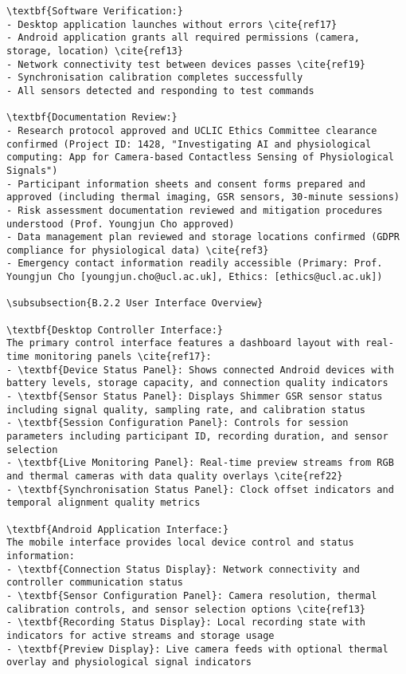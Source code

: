 \begin{verbatim}
\textbf{Software Verification:}
- Desktop application launches without errors \cite{ref17}
- Android application grants all required permissions (camera, storage, location) \cite{ref13}
- Network connectivity test between devices passes \cite{ref19}
- Synchronisation calibration completes successfully
- All sensors detected and responding to test commands

\textbf{Documentation Review:}
- Research protocol approved and UCLIC Ethics Committee clearance confirmed (Project ID: 1428, "Investigating AI and physiological computing: App for Camera-based Contactless Sensing of Physiological Signals")
- Participant information sheets and consent forms prepared and approved (including thermal imaging, GSR sensors, 30-minute sessions)
- Risk assessment documentation reviewed and mitigation procedures understood (Prof. Youngjun Cho approved)
- Data management plan reviewed and storage locations confirmed (GDPR compliance for physiological data) \cite{ref3}
- Emergency contact information readily accessible (Primary: Prof. Youngjun Cho [youngjun.cho@ucl.ac.uk], Ethics: [ethics@ucl.ac.uk])

\subsubsection{B.2.2 User Interface Overview}

\textbf{Desktop Controller Interface:}
The primary control interface features a dashboard layout with real-time monitoring panels \cite{ref17}:
- \textbf{Device Status Panel}: Shows connected Android devices with battery levels, storage capacity, and connection quality indicators
- \textbf{Sensor Status Panel}: Displays Shimmer GSR sensor status including signal quality, sampling rate, and calibration status
- \textbf{Session Configuration Panel}: Controls for session parameters including participant ID, recording duration, and sensor selection
- \textbf{Live Monitoring Panel}: Real-time preview streams from RGB and thermal cameras with data quality overlays \cite{ref22}
- \textbf{Synchronisation Status Panel}: Clock offset indicators and temporal alignment quality metrics

\textbf{Android Application Interface:}
The mobile interface provides local device control and status information:
- \textbf{Connection Status Display}: Network connectivity and controller communication status
- \textbf{Sensor Configuration Panel}: Camera resolution, thermal calibration controls, and sensor selection options \cite{ref13}
- \textbf{Recording Status Display}: Local recording state with indicators for active streams and storage usage
- \textbf{Preview Display}: Live camera feeds with optional thermal overlay and physiological signal indicators


\end{verbatim}
